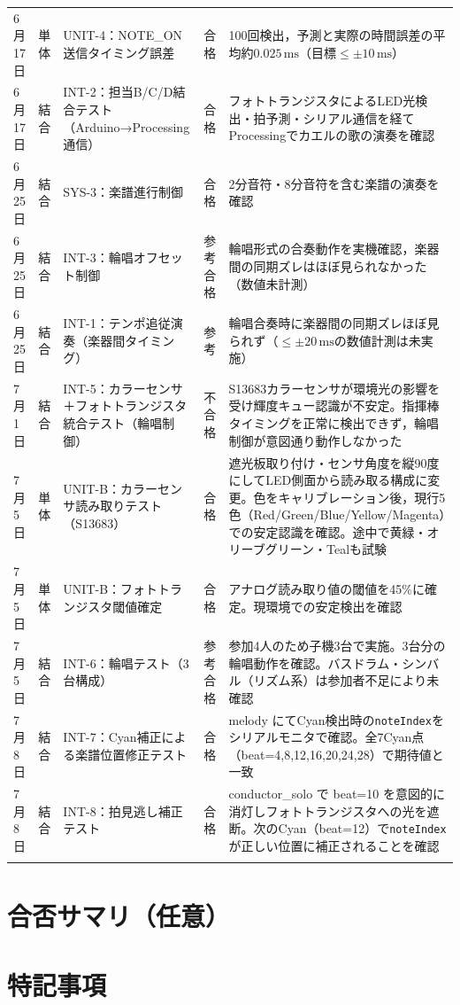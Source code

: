 \begin{longtable}{p{2cm}p{2cm}p{4.5cm}p{1.5cm}p{4cm}}
6月17日 & 単体 & UNIT-4：NOTE\_ON送信タイミング誤差 & 合格 & 100回検出，予測と実際の時間誤差の平均約$0.025\,\mathrm{ms}$（目標$\leq \pm 10\,\mathrm{ms}$）\\
6月17日 & 結合 & INT-2：担当B/C/D結合テスト（Arduino→Processing通信） & 合格 & フォトトランジスタによるLED光検出・拍予測・シリアル通信を経てProcessingでカエルの歌の演奏を確認 \\
6月25日 & 結合 & SYS-3：楽譜進行制御 & 合格 & 2分音符・8分音符を含む楽譜の演奏を確認 \\
6月25日 & 結合 & INT-3：輪唱オフセット制御 & 参考合格 & 輪唱形式の合奏動作を実機確認，楽器間の同期ズレはほぼ見られなかった（数値未計測）\\
6月25日 & 結合 & INT-1：テンポ追従演奏（楽器間タイミング） & 参考 & 輪唱合奏時に楽器間の同期ズレほぼ見られず（$\leq\pm20\,\mathrm{ms}$の数値計測は未実施）\\
7月1日 & 結合 & INT-5：カラーセンサ＋フォトトランジスタ統合テスト（輪唱制御） & 不合格 & S13683カラーセンサが環境光の影響を受け輝度キュー認識が不安定。指揮棒タイミングを正常に検出できず，輪唱制御が意図通り動作しなかった \\
7月5日 & 単体 & UNIT-B：カラーセンサ読み取りテスト（S13683） & 合格 & 遮光板取り付け・センサ角度を縦90度にしてLED側面から読み取る構成に変更。色をキャリブレーション後，現行5色（Red/Green/Blue/Yellow/Magenta）での安定認識を確認。途中で黄緑・オリーブグリーン・Tealも試験 \\
7月5日 & 単体 & UNIT-B：フォトトランジスタ閾値確定 & 合格 & アナログ読み取り値の閾値を45\%に確定。現環境での安定検出を確認 \\
7月5日 & 結合 & INT-6：輪唱テスト（3台構成） & 参考合格 & 参加4人のため子機3台で実施。3台分の輪唱動作を確認。バスドラム・シンバル（リズム系）は参加者不足により未確認 \\
7月8日 & 結合 & INT-7：Cyan補正による楽譜位置修正テスト & 合格 & melody にてCyan検出時の\texttt{noteIndex}をシリアルモニタで確認。全7Cyan点（beat=4,8,12,16,20,24,28）で期待値と一致 \\
7月8日 & 結合 & INT-8：拍見逃し補正テスト & 合格 & conductor\_solo で beat=10 を意図的に消灯しフォトトランジスタへの光を遮断。次のCyan（beat=12）で\texttt{noteIndex}が正しい位置に補正されることを確認 \\

\bottomrule
\endfoot
\end{longtable}

\section{合否サマリ（任意）}

%

\section{特記事項}

